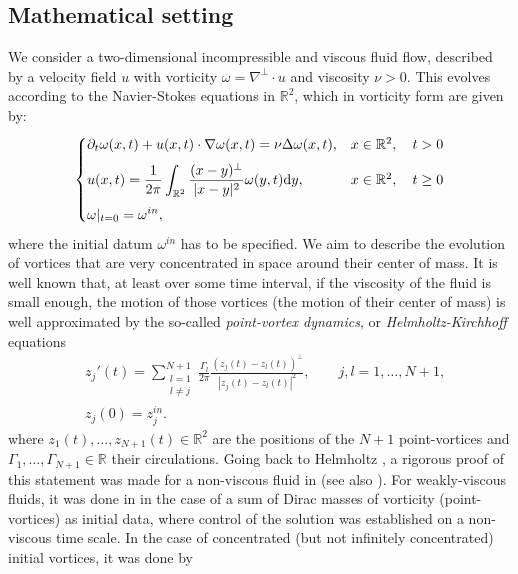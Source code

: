 \documentclass[11pt,reqno,a4paper]{amsart}
\def\dd{{\rm d}}
\def\de{{\partial}}
\def\RR {\mathbb{R}}
\def\R {\mathbb{R}} %
\newcommand{\1}{\mathbbm{1}}
\theoremstyle{definition}
\theoremstyle{definition}
\numberwithin{equation}{section}
\begin{document}
\subsection{Mathematical setting}
We consider a two-dimensional incompressible and viscous fluid flow,  described by a velocity field $u$ with vorticity $\omega=\nabla^\perp\cdot u$ and viscosity $\nu > 0$. This evolves according to the Navier-Stokes equations in $\R^2$, which in vorticity form are given by:
\begin{equation}
\label{eq:NS}
    \begin{cases}
        \displaystyle \de_t \omega(x,t) +u(x,t)\cdot \nabla \omega(x,t) =\nu \Delta \omega(x,t),  & x\in \RR^2, \quad t>0 \vspace{2mm}\\
        \displaystyle u(x,t) = \frac{1}{2\pi}\int_{\RR^2}\frac{(x-y)^\perp}{|x-y|^2}\omega(y,t) \dd y, & x\in \RR^2, \quad t \ge 0\vspace{2mm}\\
        \displaystyle  \omega|_{t=0}=\omega^{in},
    \end{cases}
\end{equation}
where the initial datum $\omega^{in}$ has to be specified. We aim to describe the evolution of vortices that are very concentrated in space around their center of mass. It is well known that, at least over some time interval, if the viscosity of the fluid is small enough, the motion of those vortices (the motion of their center of mass) is well approximated by the so-called \emph{point-vortex dynamics}, or \emph{Helmholtz-Kirchhoff} equations
\begin{align}
\label{eq:HK}
    & z_j'(t)=\sum_{\substack{l=1 \\ l\neq j}}^{N+1}\frac{\Gamma_l}{2\pi}\frac{(z_j(t)-z_l(t))^\perp}{|z_j(t)-z_l(t)|^2}, \qquad j,l=1,\dots, N+1, \\
    & z_j(0) = z_j^{in}.
\end{align}
where $z_1(t),\dots,z_{N+1}(t)\in \mathbb{R}^2$ are the positions of the $N+1$ point-vortices  and $\Gamma_1,\dots,\Gamma_{N+1}\in \RR$ their circulations. Going back to Helmholtz \cite{Helmholtz_1858}, a rigorous proof of this statement was made for a non-viscous fluid in \cite{MarPul84} (see also \cite{MarPul94}). For weakly-viscous fluids, it was done in \cite{Gallay2011} in the case of a sum of Dirac masses of vorticity (point-vortices) as initial data, where control of the solution was established on a non-viscous time scale. In the case of concentrated (but not infinitely concentrated) initial vortices, it was done by
\end{document}
